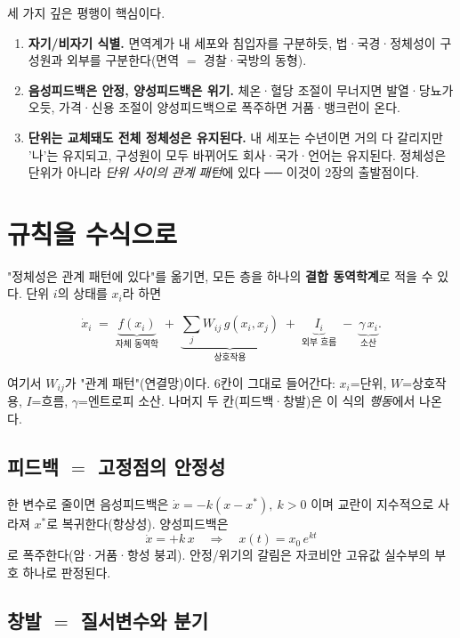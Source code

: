 \documentclass[11pt]{article}
\begin{document}
세 가지 깊은 평행이 핵심이다.

\begin{enumerate}[leftmargin=1.4em,itemsep=0.2em]
\item \textbf{자기/비자기 식별.} 면역계가 내 세포와 침입자를 구분하듯, 법·국경·정체성이 구성원과 외부를 구분한다(면역 $=$ 경찰·국방의 동형).
\item \textbf{음성피드백은 안정, 양성피드백은 위기.} 체온·혈당 조절이 무너지면 발열·당뇨가 오듯, 가격·신용 조절이 양성피드백으로 폭주하면 거품·뱅크런이 온다.
\item \textbf{단위는 교체돼도 전체 정체성은 유지된다.} 내 세포는 수년이면 거의 다 갈리지만 '나'는 유지되고, 구성원이 모두 바뀌어도 회사·국가·언어는 유지된다. 정체성은 단위가 아니라 \emph{단위 사이의 관계 패턴}에 있다 ── 이것이 2장의 출발점이다.
\end{enumerate}

\section{규칙을 수식으로}

"정체성은 관계 패턴에 있다"를 옮기면, 모든 층을 하나의 \textbf{결합 동역학계}로 적을 수 있다. 단위 $i$의 상태를 $x_i$라 하면

\begin{equation}
\dot{x}_i \;=\; \underbrace{f(x_i)}_{\text{자체 동역학}} \;+\; \underbrace{\sum_j W_{ij}\,g(x_i,x_j)}_{\text{상호작용}} \;+\; \underbrace{I_i}_{\text{외부 흐름}} \;-\; \underbrace{\gamma\,x_i}_{\text{소산}} .
\end{equation}

여기서 $W_{ij}$가 "관계 패턴"(연결망)이다. 6칸이 그대로 들어간다: $x_i$=단위, $W$=상호작용, $I$=흐름, $\gamma$=엔트로피 소산. 나머지 두 칸(피드백·창발)은 이 식의 \emph{행동}에서 나온다.

\subsection{피드백 $=$ 고정점의 안정성}

한 변수로 줄이면 음성피드백은 $\dot{x}=-k(x-x^{*}),\ k>0$ 이며 교란이 지수적으로 사라져 $x^{*}$로 복귀한다(항상성). 양성피드백은
\begin{equation}
\dot{x}=+k\,x \quad\Longrightarrow\quad x(t)=x_0\,e^{kt}
\end{equation}
로 폭주한다(암·거품·항성 붕괴). 안정/위기의 갈림은 자코비안 고유값 실수부의 부호 하나로 판정된다.

\subsection{창발 $=$ 질서변수와 분기}
\end{document}
